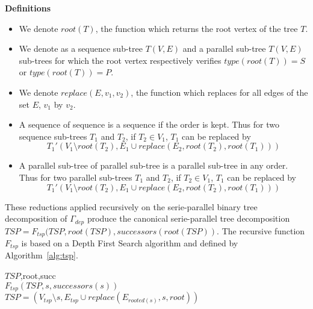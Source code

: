 \medskip
\noindent \textbf{Definitions}
\begin{itemize}
\item We denote $root(T)$, the function which returns the root vertex of the tree $T$.
\item We denote as a sequence sub-tree $T(V,E)$ and a parallel sub-tree $T(V,E)$ sub-trees for which the root vertex respectively verifies $type(root(T))=S$ or $type(root(T))=P$.
\item We denote $replace(E,v_1,v_2)$, the function which replaces for all edges of the set $E$, $v_1$ by $v_2$.
\item A sequence of sequence is a sequence if the order is kept. Thus for two sequence sub-trees $T_1$ and $T_2$, if $T_2 \in V_1$, $T_1$ can be replaced by 
\begin{equation*}
T_1'(V_1 \setminus root(T_2),E_1 \cup replace(E_2,root(T_2),root(T_1)))
\end{equation*}
\item A parallel sub-tree of parallel sub-tree is a parallel sub-tree in any order. Thus for two parallel sub-trees $T_1$ and $T_2$, if $T_2 \in V_1$, $T_1$ can be replaced by 
\begin{equation*}
T_1'(V_1 \setminus root(T_2),E_1 \cup replace(E_2,root(T_2),root(T_1)))
\end{equation*}
\end{itemize}

These reductions applied recursively on the serie-parallel binary tree decomposition of $\Gamma_{dep}$ produce the canonical serie-parallel tree decomposition $TSP = F_{tsp}(TSP,root(TSP),successors(root(TSP))$. The recursive function $F_{tsp}$ is based on a Depth First Search algorithm and defined by Algorithm~\ref{alg:tsp}.

\begin{algorithm}
\caption{$F_{tsp}$}
\label{alg:tsp}
\begin{algorithmic}[1]
 {$TSP$,root,succ}
\\$F_{tsp}(TSP,s,successors(s))$
\\$TSP = (V_{tsp} \setminus s,E_{tsp} \cup replace(E_{rooted(s)},s,root))$
\EndIf
\EndIf
\EndFor
\EndProcedure
\end{algorithmic}
\end{algorithm}

